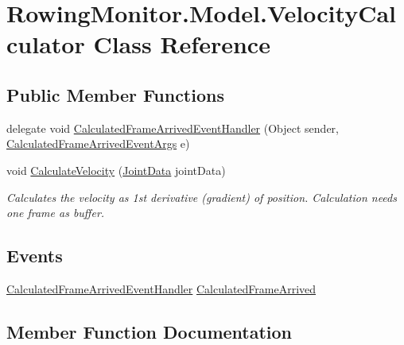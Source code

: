 \hypertarget{class_rowing_monitor_1_1_model_1_1_velocity_calculator}{}\section{Rowing\+Monitor.\+Model.\+Velocity\+Calculator Class Reference}
\label{class_rowing_monitor_1_1_model_1_1_velocity_calculator}
\subsection*{Public Member Functions}
\begin{DoxyCompactItemize}
\item 
delegate void \hyperlink{class_rowing_monitor_1_1_model_1_1_velocity_calculator_aba102b7d4623af9933bfe091c2ad1d9b}{Calculated\+Frame\+Arrived\+Event\+Handler} (Object sender, \hyperlink{class_rowing_monitor_1_1_model_1_1_calculated_frame_arrived_event_args}{Calculated\+Frame\+Arrived\+Event\+Args} e)
\item 
void \hyperlink{class_rowing_monitor_1_1_model_1_1_velocity_calculator_a49c8bd67bb150dbd6e1e7c3ed31dc699}{Calculate\+Velocity} (\hyperlink{struct_rowing_monitor_1_1_model_1_1_util_1_1_joint_data}{Joint\+Data} joint\+Data)
\begin{DoxyCompactList}\small\item\em Calculates the velocity as 1st derivative (gradient) of position. Calculation needs one frame as buffer. \end{DoxyCompactList}\end{DoxyCompactItemize}
\subsection*{Events}
\begin{DoxyCompactItemize}
\item 
\hyperlink{class_rowing_monitor_1_1_model_1_1_velocity_calculator_aba102b7d4623af9933bfe091c2ad1d9b}{Calculated\+Frame\+Arrived\+Event\+Handler} \hyperlink{class_rowing_monitor_1_1_model_1_1_velocity_calculator_a0da4ec78b2279bb46e43c9e35914e573}{Calculated\+Frame\+Arrived}
\end{DoxyCompactItemize}


\subsection{Member Function Documentation}
\mbox{\label{class_rowing_monitor_1_1_model_1_1_velocity_calculator_aba102b7d4623af9933bfe091c2ad1d9b}} 
